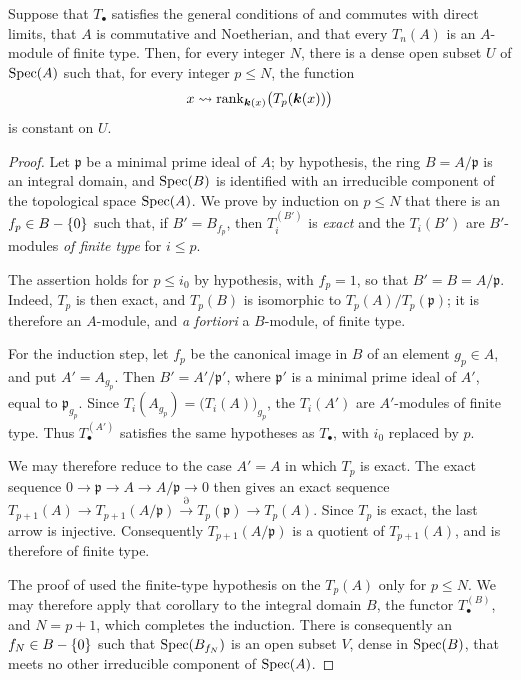 \begin{corollary}[7.3.10]
\label{III.7.3.10}
Suppose that $T_\bullet$ satisfies the general conditions of
 and commutes with direct limits, that $A$ is
commutative and Noetherian, and that every $T_n(A)$ is an
$A$-module of finite type.  Then, for every integer $N$, there
is a dense open subset $U$ of $\operatorname{Spec}(A)$ such that, for every
integer $p\leq N$, the function
\[
  x\leadsto
  \operatorname{rank}_{\boldsymbol{k}(x)}
  \bigl(T_p(\boldsymbol{k}(x))\bigr)
\]
is constant on $U$.
\end{corollary}

\begin{proof}
Let $\mathfrak p$ be a minimal prime ideal of $A$; by hypothesis, the ring
$B=A/\mathfrak p$ is an integral domain, and $\operatorname{Spec}(B)$ is
identified with an irreducible component of the topological
space $\operatorname{Spec}(A)$.  We prove by induction on $p\leq N$ that
there is an $f_p\in B-\{0\}$ such that, if
$B'=B_{f_p}$, then $T_i^{(B')}$ is \emph{exact} and the $T_i(B')$ are
$B'$-modules \emph{of finite type} for $i\leq p$.

The assertion holds for $p\leq i_0$ by hypothesis, with
$f_p=1$, so that $B'=B=A/\mathfrak p$.  Indeed, $T_p$ is then
exact, and $T_p(B)$ is isomorphic to $T_p(A)/T_p(\mathfrak p)$;
it is therefore an $A$-module, and \emph{a fortiori} a
$B$-module, of finite type.

For the induction step, let $f_p$ be the canonical image in
$B$ of an element $g_p\in A$, and put $A'=A_{g_p}$.  Then $B'=A'/\mathfrak p'$,
where $\mathfrak p'$ is a minimal prime ideal of $A'$, equal to
$\mathfrak p_{g_p}$.  Since $T_i(A_{g_p})=\bigl(T_i(A)\bigr)_{g_p}$,
the $T_i(A')$ are $A'$-modules of finite type.  Thus
$T_\bullet^{(A')}$ satisfies the same hypotheses as
$T_\bullet$, with $i_0$ replaced by $p$.

We may therefore reduce to the case $A'=A$ in which $T_p$ is
exact.  The exact sequence $0\longrightarrow\mathfrak p\longrightarrow A\longrightarrow A/\mathfrak p\longrightarrow0$
then gives an exact sequence $T_{p+1}(A)\longrightarrow T_{p+1}(A/\mathfrak p)\xrightarrow{\partial}T_p(\mathfrak p)\longrightarrow T_p(A)$.
Since $T_p$ is exact, the last arrow is injective.
Consequently $T_{p+1}(A/\mathfrak p)$ is a quotient of
$T_{p+1}(A)$, and is therefore of finite type.

The proof of  used the finite-type hypothesis
on the $T_p(A)$ only for $p\leq N$.  We may therefore apply that
corollary to the integral domain $B$, the functor
$T_\bullet^{(B)}$, and $N=p+1$, which completes the induction.
There is consequently an $f_N\in B-\{0\}$ such that
$\operatorname{Spec}(B_{f_N})$ is an open subset $V$, dense in $\operatorname{Spec}(B)$,
that meets no other irreducible component of $\operatorname{Spec}(A)$.


\end{proof}
